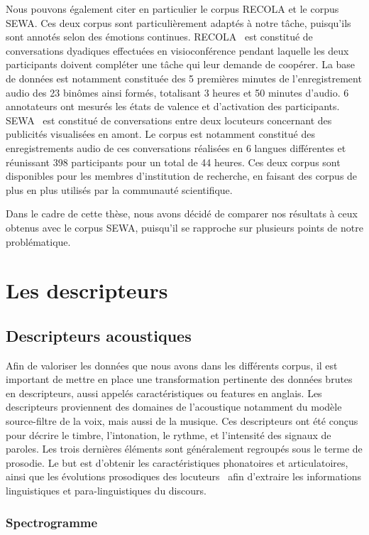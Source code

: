 Nous pouvons également citer en particulier le corpus RECOLA et le corpus SEWA. Ces deux corpus sont particulièrement adaptés à notre tâche, puisqu'ils sont annotés selon des émotions continues.
RECOLA~\cite{Ringeval2013} est constitué de conversations dyadiques effectuées en visioconférence pendant laquelle les deux participants doivent compléter une tâche qui leur demande de coopérer. La base de données est notamment constituée des 5 premières minutes de l'enregistrement audio des 23 binômes ainsi formés, totalisant 3 heures et 50 minutes d'audio. 6 annotateurs ont mesurés les états de valence et d'activation des participants.
SEWA~\cite{SEWA} est constitué de conversations entre deux locuteurs concernant des publicités visualisées en amont. Le corpus est notamment constitué des enregistrements audio de ces conversations réalisées en 6 langues différentes et réunissant 398 participants pour un total de 44 heures. Ces deux corpus sont disponibles pour les membres d'institution de recherche, en faisant des corpus de plus en plus utilisés par la communauté scientifique.

Dans le cadre de cette thèse, nous avons décidé de comparer nos résultats à ceux obtenus avec le corpus SEWA, puisqu'il se rapproche sur plusieurs points de notre problématique.

\section{Les descripteurs}
\subsection{Descripteurs acoustiques}
\label{sec:3.3.1}
Afin de valoriser les données que nous avons dans les différents corpus, il est important de mettre en place une transformation pertinente des données brutes en descripteurs, aussi appelés caractéristiques ou features en anglais. Les descripteurs proviennent des domaines de l'acoustique notamment du modèle source-filtre de la voix, mais aussi de la musique. Ces descripteurs ont été conçus pour décrire le timbre, l'intonation, le rythme, et l'intensité des signaux de paroles. Les trois dernières éléments sont généralement regroupés sous le terme de prosodie. Le but est d'obtenir les caractéristiques phonatoires et articulatoires, ainsi que les évolutions prosodiques des locuteurs~\cite{Scherer1986} afin d'extraire les informations linguistiques et para-linguistiques du discours.

\subsubsection{Spectrogramme}
%

